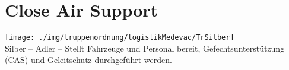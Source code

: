 \section{Close Air Support}
\texttt{[image: ./img/truppenordnung/logistikMedevac/TrSilber]}\\
Silber -- Adler -- Stellt Fahrzeuge und Personal bereit,  Gefechtsunterstützung (\ac{CAS}) und Geleitschutz durchgeführt werden.